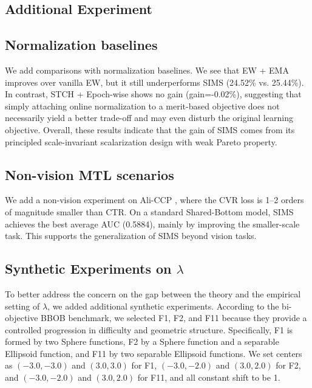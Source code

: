 \documentclass[sigconf]{acmart}
\begin{document}
\begin{add}


\section{Additional Experiment}
\subsection{Normalization baselines}
We add comparisons with normalization baselines.  We see that EW + EMA improves over vanilla EW, but it still underperforms SIMS (24.52\% vs. 25.44\%). In contrast, STCH + Epoch-wise shows no gain (gain=-0.02\%), suggesting that simply attaching online normalization to a merit-based objective does not necessarily yield a better trade-off and may even disturb the original learning objective. Overall, these results indicate that the gain of SIMS comes from its principled scale-invariant scalarization design with weak Pareto property.
\subsection{Non-vision MTL scenarios}
We add a non-vision experiment on Ali-CCP \cite{ma2018entire}, where the CVR loss is 1–2 orders of magnitude smaller than CTR.  On a standard Shared-Bottom model, SIMS achieves the best average AUC (0.5884), mainly by improving the smaller-scale task. This supports the generalization of SIMS beyond vision tasks.
\subsection{Synthetic Experiments on $\lambda$}
To better address the concern on the gap between the theory and the empirical setting of $\lambda$, we added additional synthetic experiments. According to the bi-objective BBOB \cite{brockhoff2022using} benchmark, we selected F1, F2, and F11 because they provide a controlled progression in difficulty and geometric structure.
Specifically, F1 is formed by two Sphere functions, F2 by a Sphere function and a separable Ellipsoid function, and F11 by two separable Ellipsoid functions. We set centers as $(-3.0,-3.0)$ and $(3.0,3.0)$ for F1, $(-3.0,-2.0)$ and $(3.0,2.0)$ for F2, and $(-3.0,-2.0)$ and $(3.0,2.0)$ for F11, and all constant shift to be 1.


\end{add}
\end{document}
